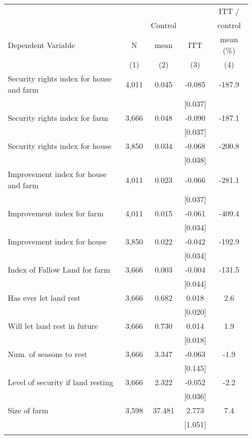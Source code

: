 \begin{tabular}{lcccc}
\hline \noalign{\smallskip} &  &  &  & ITT /\\
 &  & Control &  & control\\
Dependent Variable & N & mean & ITT & mean (\%)\\
 & (1) & (2) & (3) & (4)\\
\noalign{\smallskip}\hline \noalign{\smallskip}Security rights index for house and farm & 4,011 & 0.045 & -0.085 & -187.9\\
 &  &  & [0.037] & \\
\quad Security rights index for farm & 3,666 & 0.048 & -0.090 & -187.1\\
 &  &  & [0.037] & \\
\quad Security rights index for house & 3,850 & 0.034 & -0.068 & -200.8\\
 &  &  & [0.038] & \\
Improvement index for house and farm & 4,011 & 0.023 & -0.066 & -281.1\\
 &  &  & [0.037] & \\
\quad Improvement index for farm & 4,011 & 0.015 & -0.061 & -409.4\\
 &  &  & [0.034] & \\
\quad Improvement index for house & 3,850 & 0.022 & -0.042 & -192.9\\
 &  &  & [0.034] & \\
Index of Fallow Land for farm & 3,666 & 0.003 & -0.004 & -131.5\\
 &  &  & [0.044] & \\
\quad Has ever let land rest & 3,666 & 0.682 & 0.018 & 2.6\\
 &  &  & [0.020] & \\
\quad Will let land rest in future & 3,666 & 0.730 & 0.014 & 1.9\\
 &  &  & [0.018] & \\
\quad Num. of seasons to rest & 3,666 & 3.347 & -0.063 & -1.9\\
 &  &  & [0.145] & \\
\quad Level of security if land resting & 3,666 & 2.322 & -0.052 & -2.2\\
 &  &  & [0.036] & \\
Size of farm & 3,598 & 37.481 & 2.773 & 7.4\\
 &  &  & [1.051] & \\
\noalign{\smallskip}\hline\end{tabular}
